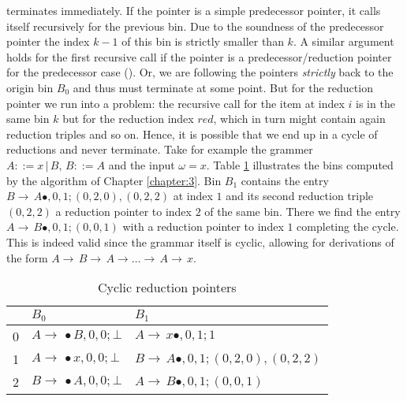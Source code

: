 \begin{isabellebody}
\begin{isamarkuptext}
terminates immediately. If the pointer is a simple predecessor pointer, it calls itself recursively
for the previous bin. Due to the soundness of the predecessor pointer the index $k-1$ of this bin
is strictly smaller than $k$. A similar argument holds for the first recursive call if the pointer
is a predecessor/reduction pointer for the predecessor case (). Or, we are following
the pointers \textit{strictly} back to the origin bin $B_0$ and thus must terminate at some point. But for
the reduction pointer we run into a problem: the recursive call for the item at index $i$ is in the same
bin $k$ but for the reduction index $red$, which in turn might contain again reduction triples and so on.
Hence, it is possible that we end up in a cycle of reductions and never terminate. Take for example the
grammer $A ::= x \, | \, B, \, B ::= A$ and the input $\omega = x$. Table \ref{tab:cyclic-pointers}
illustrates the bins computed by the algorithm of Chapter \ref{chapter:3}. Bin $B_1$ contains the entry
$B \rightarrow \, A \bullet, 0, 1; (0, 2, 0),(0, 2, 2)$ at index $1$ and its second reduction triple
$(0, 2, 2)$ a reduction pointer to index $2$ of the same bin. There we find the entry
$A \rightarrow \, B \bullet, 0, 1; (0, 0, 1)$ with a reduction pointer to index $1$ completing the
cycle. This is indeed valid since the grammar itself is cyclic, allowing for derivations of the form
$A \rightarrow \, B \rightarrow \, A \rightarrow \dots \rightarrow \, A \rightarrow \, x$.

  \begin{table}[htpb]
    \caption[Cyclic reduction pointers]{Cyclic reduction pointers} \label{tab:cyclic-pointers}
    \centering
    \begin{tabular}{| l | l | l |}
          & $B_0$                                     & $B_1$ \\
      \midrule
        0 & $A \rightarrow \, \bullet B, 0, 0; \bot$  & $A \rightarrow \, x \bullet, 0, 1; 1$ \\
        1 & $A \rightarrow \, \bullet x, 0, 0; \bot$  & $B \rightarrow \, A \bullet, 0, 1; (0, 2, 0),(0, 2, 2)$ \\
        2 & $B \rightarrow \, \bullet A, 0, 0; \bot$  & $A \rightarrow \, B \bullet, 0, 1; (0, 0, 1)$ \\
    \end{tabular}
  \end{table}


\end{isamarkuptext}
\end{isabellebody}
